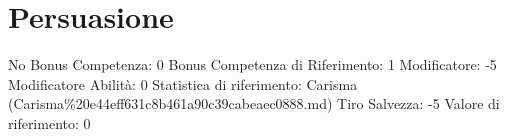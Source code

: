 \section{Persuasione}\label{persuasione}

\begin{description}
\tightlist
\item[Tags: ABI]
No Bonus Competenza: 0 Bonus Competenza di Riferimento: 1 Modificatore:
-5 Modificatore Abilità: 0 Statistica di riferimento: Carisma
(Carisma\%20e44eff631c8b461a90c39cabeaec0888.md) Tiro Salvezza: -5
Valore di riferimento: 0
\end{description}
